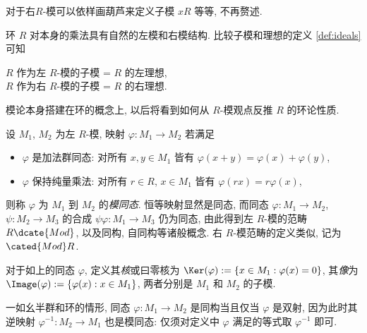对于右$R$-模可以依样画葫芦来定义子模 $xR$ 等等, 不再赘述.

\begin{example}
	环 $R$ 对本身的乘法具有自然的左模和右模结构. 比较子模和理想的定义 \ref{def:ideals} 可知
	\begin{center}
		$R$ 作为左 $R$-模的子模 = $R$ 的左理想, \\
		$R$ 作为右 $R$-模的子模 = $R$ 的右理想.
	\end{center}
	模论本身搭建在环的概念上, 以后将看到如何从 $R$-模观点反推 $R$ 的环论性质.
\end{example}

\begin{definition}
	设 $M_1$, $M_2$ 为左 $R$-模, 映射 $\varphi: M_1 \to M_2$ 若满足
	\begin{itemize}
		\item $\varphi$ 是加法群同态: 对所有 $x, y \in M_1$ 皆有 $\varphi(x+y)=\varphi(x) + \varphi(y)$,
		\item $\varphi$ 保持纯量乘法: 对所有 $r \in R$, $x \in M_1$ 皆有 $\varphi(rx) = r\varphi(x)$,
	\end{itemize}
	则称 $\varphi$ 为 $M_1$ 到 $M_2$ 的\emph{模同态}. 恒等映射显然是同态, 而同态 $\varphi: M_1 \to M_2$, $\psi: M_2 \to M_3$ 的合成 $\psi\varphi: M_1 \to M_3$ 仍为同态, 由此得到左 $R$-模的范畴 $R\dcate{Mod}$, 以及同构, 自同构等诸般概念. 右 $R$-模范畴的定义类似, 记为 $\cated{Mod}R$.

	对于如上的同态 $\varphi$, 定义其\emph{核}或曰零核为 $\Ker(\varphi) := \{x \in M_1 : \varphi(x)=0 \}$, 其\emph{像}为 $\Image(\varphi) := \{\varphi(x) : x \in M_1\}$, 两者分别是 $M_1$ 和 $M_2$ 的子模.
\end{definition}

一如幺半群和环的情形, 同态 $\varphi: M_1 \to M_2$ 是同构当且仅当 $\varphi$ 是双射, 因为此时其逆映射 $\varphi^{-1}: M_2 \to M_1$ 也是模同态: 仅须对定义中 $\varphi$ 满足的等式取 $\varphi^{-1}$ 即可.

